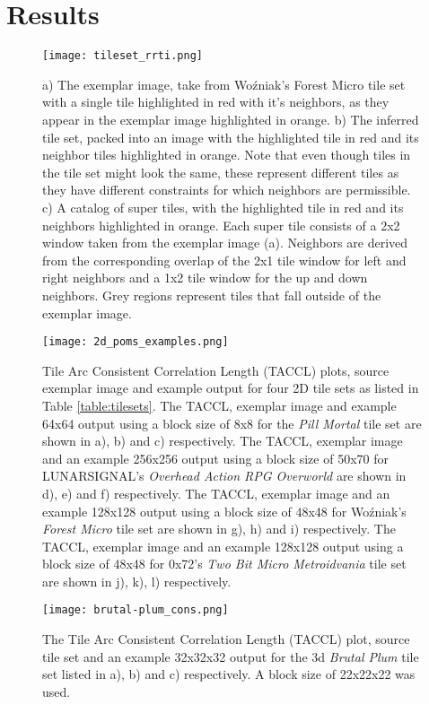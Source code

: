 \section{Results}

\begin{figure}[h]
  \texttt{[image: tileset\_rrti.png]}
  \caption{a) The exemplar image, take from Wo\'zniak's Forest Micro tile set with a single tile highlighted in red with it's neighbors, as they appear in
           the exemplar image highlighted in orange.
           b) The inferred tile set, packed into an image with the highlighted tile in red and its neighbor tiles highlighted in orange. Note that even though
           tiles in the tile set might look the same, these represent different tiles as they have different constraints for which neighbors are permissible.
           c) A catalog of super tiles, with the highlighted tile in red and its neighbors highlighted in orange. Each super tile consists of a 2x2 window
           taken from the exemplar image (a). Neighbors are derived from the corresponding overlap of the 2x1 tile window  for left and right neighbors and
           a 1x2 tile window for the up and down neighbors. Grey regions represent tiles that fall outside of the exemplar image. }
  \label{fig:rrti_tileset}
\end{figure}

\begin{figure*}[ht]
  \texttt{[image: 2d\_poms\_examples.png]}
  \caption{Tile Arc Consistent Correlation Length (TACCL) plots, source exemplar image and example output for four 2D tile sets as listed in Table \ref{table:tilesets}.
           The TACCL, exemplar image and example 64x64 output using a block size of 8x8 for the \textit{Pill Mortal} tile set are shown in a), b) and c) respectively. The TACCL, exemplar image and an example 256x256 output using a block size of 50x70 for LUNARSIGNAL's \textit{Overhead Action RPG Overworld} are shown in d), e) and f) respectively. The TACCL, exemplar image and an example 128x128 output using a block size of 48x48 for Wo\'zniak's \textit{Forest Micro} tile set are shown in g), h) and i) respectively. The TACCL, exemplar image and an example 128x128 output using a block size of 48x48 for 0x72's \textit{Two Bit Micro Metroidvania} tile set are shown in j), k), l) respectively. }
  \label{fig:2dexamples}
\end{figure*}

\begin{figure}[h]
  \centering
  \texttt{[image: brutal-plum\_cons.png]}
  \caption{The Tile Arc Consistent Correlation Length (TACCL) plot, source tile set and an example 32x32x32 output for the 3d \textit{Brutal Plum} tile set listed in a), b) and c) respectively. A block size of 22x22x22 was used.}
  \label{fig:brutal_plum}
\end{figure}

